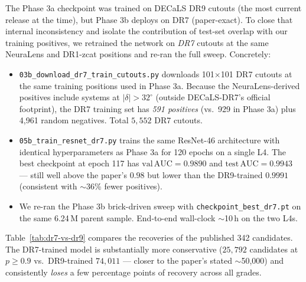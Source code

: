 \documentclass[11pt,letterpaper]{article}
\begin{document}
The Phase 3a checkpoint was trained on DECaLS DR9 cutouts (the most
current release at the time), but Phase 3b deploys on DR7 (paper-exact).
To close that internal inconsistency and isolate the contribution of
test-set overlap with our training positives, we retrained the network
on \emph{DR7} cutouts at the same NeuraLens and DR1-zcat positions and
re-ran the full sweep. Concretely:

\begin{itemize}
\item \texttt{03b\_download\_dr7\_train\_cutouts.py} downloads 101$\times$101
      DR7 cutouts at the same training positions used in Phase 3a.
      Because the \citet{huang2020decals} NeuraLens-derived positives
      include systems at $|\delta| > 32^\circ$ (outside DECaLS-DR7's
      official footprint), the DR7 training set has \emph{591 positives}
      (vs.\ 929 in Phase 3a) plus 4{,}961 random negatives. Total
      $5{,}552$ DR7 cutouts.
\item \texttt{05b\_train\_resnet\_dr7.py} trains the same
      \textcite{lanusse2018cmu} ResNet-46 architecture with identical
      hyperparameters as Phase 3a for 120 epochs on a single L4. The
      best checkpoint at epoch 117 has $\mathrm{val\,AUC} = 0.9890$ and
      $\mathrm{test\,AUC} = 0.9943$ — still well above the paper's
      $0.98$ but lower than the DR9-trained $0.9991$ (consistent with
      $\sim$36\% fewer positives).
\item We re-ran the Phase 3b brick-driven sweep with
      \texttt{checkpoint\_best\_dr7.pt} on the same 6.24\,M parent
      sample. End-to-end wall-clock $\sim$10\,h on the two L4s.
\end{itemize}

Table~\ref{tab:dr7-vs-dr9} compares the recoveries of the published
342 \textcite{huang2020decals} candidates. The DR7-trained model is
substantially more conservative ($25{,}792$ candidates at $p \geq 0.9$
vs.\ DR9-trained $74{,}011$ — closer to the paper's stated
$\sim$50{,}000) and consistently \emph{loses} a few percentage points
of recovery across all grades.
\end{document}
